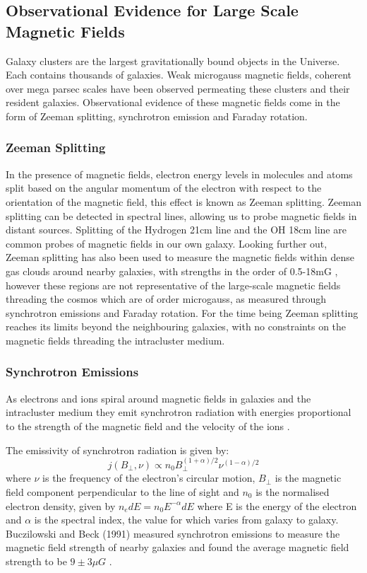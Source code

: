 \subsection{Observational Evidence for Large Scale Magnetic Fields}

Galaxy clusters are the largest gravitationally bound objects in the Universe. Each contains thousands of galaxies. Weak microgauss magnetic fields, coherent over mega parsec scales have been observed permeating these clusters and their resident galaxies. Observational evidence of these magnetic fields come in the form of Zeeman splitting, synchrotron emission and Faraday rotation.

\subsubsection{Zeeman Splitting}

In the presence of magnetic fields, electron energy levels in molecules and atoms split based on the angular momentum of the electron with respect to the orientation of the magnetic field, this effect is known as Zeeman splitting. Zeeman splitting can be detected in spectral lines, allowing us to probe magnetic fields in distant sources. Splitting of the Hydrogen 21cm line and the OH 18cm line are common probes of magnetic fields in our own galaxy. Looking further out, Zeeman splitting has also been used to measure the magnetic fields within dense gas clouds around nearby galaxies, with strengths in the order of 0.5-18mG \cite{Robishaw:2008ti}, however these regions are not representative of the large-scale magnetic fields threading the cosmos which are of order microgauss, as measured through synchrotron emissions and Faraday rotation. For the time being Zeeman splitting reaches its limits beyond the neighbouring galaxies, with no constraints on the magnetic fields threading the intracluster medium.

\subsubsection{Synchrotron Emissions}

As electrons and ions spiral around magnetic fields in galaxies and the intracluster medium they emit synchrotron radiation with energies proportional to the strength of the magnetic field and the velocity of the ions \cite{Giovannini:2003yn}.

The emissivity of synchrotron radiation is given by:
\begin{equation}
j(B_{\bot},\nu) \propto n_0 B_{\bot}^{(1+\alpha)/2} \nu ^{(1-\alpha)/2}
\end{equation}
where $\nu$ is the frequency of the electron's circular motion, $B_{\bot}$ is the magnetic field component perpendicular to the line of sight and $n_0$ is the normalised electron density, given by $n_e dE = n_0 E^{-\alpha} dE$ where E is the energy of the electron and $\alpha$ is the spectral index, the value for which varies from galaxy to galaxy. Buczilowski and Beck (1991) measured synchrotron emissions to measure the magnetic field strength of nearby galaxies and found the average magnetic field strength to be $9 \pm 3 \mu G$ \cite{1991A&A...241...47B}.

